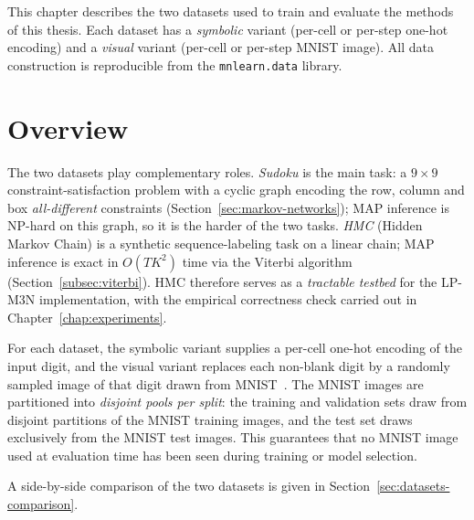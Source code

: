 This chapter describes the two datasets used to train and evaluate
the methods of this thesis. Each dataset has a \emph{symbolic}
variant (per-cell or per-step one-hot encoding) and a
\emph{visual} variant (per-cell or per-step MNIST image). All data
construction is reproducible from the \texttt{mnlearn.data}
library.

\section{Overview}
\label{sec:datasets-overview}

The two datasets play complementary roles. \emph{Sudoku} is the
main task: a $9 \times 9$ constraint-satisfaction problem with a
cyclic graph encoding the row, column and box \emph{all-different}
constraints (Section~\ref{sec:markov-networks}); MAP inference is
NP-hard on this graph, so it is the harder of the two tasks.
\emph{HMC} (Hidden Markov Chain) is a synthetic sequence-labeling
task on a linear chain; MAP inference is exact in
$O(T K^{2})$ time via the Viterbi algorithm
(Section~\ref{subsec:viterbi}). HMC therefore serves as a
\emph{tractable testbed} for the LP-M3N implementation, with the
empirical correctness check carried out in
Chapter~\ref{chap:experiments}.

For each dataset, the symbolic variant supplies a per-cell one-hot
encoding of the input digit, and the visual variant replaces each
non-blank digit by a randomly sampled image of that digit drawn
from MNIST~\cite{LeCun1998}. The MNIST images are partitioned into
\emph{disjoint pools per split}: the training and validation sets
draw from disjoint partitions of the MNIST training images, and the
test set draws exclusively from the MNIST test images. This
guarantees that no MNIST image used at evaluation time has been
seen during training or model selection.

A side-by-side comparison of the two datasets is given in
Section~\ref{sec:datasets-comparison}.